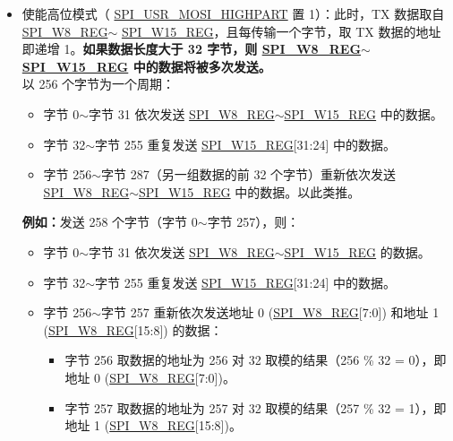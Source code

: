 \documentclass[main\_\_CN.tex]{subfiles}
\begin{document}
\begin{itemize}
\begin{itemize}
\begin{itemize}
        \end{itemize}
        \item 使能高位模式（ \hyperref[fielddesc:SPIUSRMOSIHIGHPART]{SPI\_USR\_MOSI\_HIGHPART} 置 1）：此时，TX 数据取自 \hyperref[regdesc:SPIW8REG]{SPI\_W8\_REG}$\sim$ \hyperref[regdesc:SPIW15REG]{SPI\_W15\_REG}，且每传输一个字节，取 TX 数据的地址即递增 1。\textbf{如果数据长度大于 32 字节，则 \hyperref[regdesc:SPIW8REG]{SPI\_W8\_REG}$\sim$\hyperref[regdesc:SPIW15REG]{SPI\_W15\_REG} 中的数据将被多次发送。}\\
    以 256 个字节为一个周期：
        \begin{itemize}
            \item 字节 0$\sim$字节 31 依次发送 \hyperref[regdesc:SPIW0REG]{SPI\_W8\_REG}$\sim$\hyperref[regdesc:SPIW0REG]{SPI\_W15\_REG} 中的数据。
            \item 字节 32$\sim$字节 255 重复发送 \hyperref[regdesc:SPIW0REG]{SPI\_W15\_REG}[31:24] 中的数据。
            \item 字节 256$\sim$字节 287（另一组数据的前 32 个字节）重新依次发送 \hyperref[regdesc:SPIW0REG]{SPI\_W8\_REG}$\sim$\hyperref[regdesc:SPIW0REG]{SPI\_W15\_REG} 中的数据。以此类推。
        \end{itemize}
        \textbf{例如：}发送 258 个字节（字节 0$\sim$字节 257），则：
        \begin{itemize}
            \item 字节 0$\sim$字节 31 依次发送 \hyperref[regdesc:SPIW0REG]{SPI\_W8\_REG}$\sim$\hyperref[regdesc:SPIW0REG]{SPI\_W15\_REG} 的数据。
            \item 字节 32$\sim$字节 255 重复发送 \hyperref[regdesc:SPIW0REG]{SPI\_W15\_REG}[31:24] 中的数据。
            \item 字节 256$\sim$字节 257 重新依次发送地址 0 (\hyperref[regdesc:SPIW0REG]{SPI\_W8\_REG}[7:0]) 和地址 1 (\hyperref[regdesc:SPIW0REG]{SPI\_W8\_REG}[15:8]) 的数据：
                \begin{itemize}
                    \item 字节 256 取数据的地址为 256 对 32 取模的结果（256 \% 32 = 0），即地址 0 (\hyperref[regdesc:SPIW0REG]{SPI\_W8\_REG}[7:0])。
                    \item 字节 257 取数据的地址为 257 对 32 取模的结果（257 \% 32 = 1），即地址 1 (\hyperref[regdesc:SPIW0REG]{SPI\_W8\_REG}[15:8])。
                \end{itemize}
        \end{itemize} 
    \end{itemize}

\end{itemize}
\end{document}
